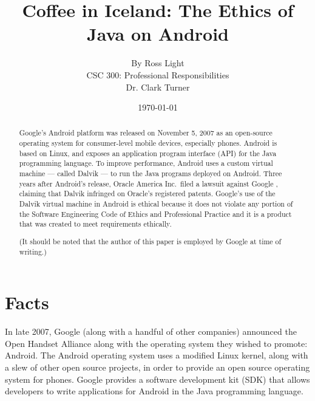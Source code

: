 \documentclass[12pt]{article}
\begin{document}
\title{\vfill Coffee in Iceland: The Ethics of Java on Android} %
\author{
By Ross Light \vspace{10pt} \\
CSC 300: Professional Responsibilities  \vspace{10pt} \\
Dr. Clark Turner \vspace{10pt} \\
}
\date{\today} %

\maketitle

\vfill  %
\begin{abstract}
Google's Android platform was released on November 5, 2007
\cite{open-handset-alliance-ann} as an open-source operating system for
consumer-level mobile devices, especially phones.  Android is based on Linux,
and exposes an application program interface (API) for the Java programming
language.  To improve performance, Android uses a custom virtual machine ---
called Dalvik --- to run the Java programs deployed on Android.  Three years
after Android's release, Oracle America Inc.~filed a lawsuit against Google
\cite{oracle-lawsuit}, claiming that Dalvik infringed on Oracle's registered
patents.  Google's use of the Dalvik virtual machine in Android is ethical
because it does not violate any portion of the Software Engineering Code of
Ethics and Professional Practice \cite{secode} and it is a product that was
created to meet requirements ethically.

(It should be noted that the author of this paper is employed by Google at
time of writing.)

\end{abstract}

\thispagestyle{empty} %
\newpage

\section{Facts}

In late 2007, Google (along with a handful of other companies) announced the
Open Handset Alliance \cite{open-handset-alliance-ann} along with the operating
system they wished to promote: Android.  The Android operating system uses a
modified Linux kernel, along with a slew of other open source projects, in
order to provide an open source operating system for phones.  Google provides a
software development kit (SDK) that allows developers to write applications for
Android in the Java programming language.
\end{document}
